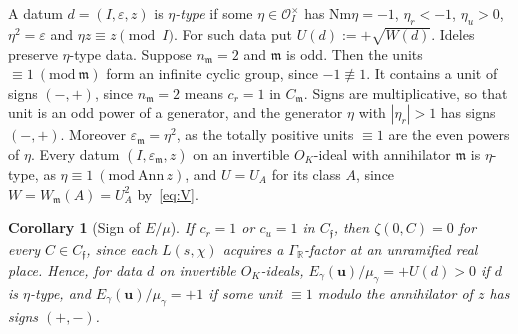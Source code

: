 \documentclass[11pt]{amsart}
\numberwithin{equation}{section}
\theoremstyle{plain}
\newtheorem{corollary}[theorem]{Corollary}
\theoremstyle{definition}
\theoremstyle{remark}
\newcommand{\Nm}{\mathrm{Nm}}
\begin{document}
A datum \(d=(I,\varepsilon,z)\) is \emph{\(\eta\)-type} if some \(\eta\in\mathcal O_I^\times\) has \(\Nm\eta=-1\), \(\eta_r<-1\), \(\eta_u>0\), \(\eta^2=\varepsilon\) and \(\eta z\equiv z\pmod I\). For such data put \(U(d):=+\sqrt{W(d)}\). Ideles preserve \(\eta\)-type data. Suppose \(n_{\mathfrak m}=2\) and \(\mathfrak m\) is odd. Then the units \(\equiv1\ (\mathrm{mod}\ \mathfrak m)\) form an infinite cyclic group, since \(-1\not\equiv1\). It contains a unit of signs \((-,+)\), since \(n_{\mathfrak m}=2\) means \(c_r=1\) in \(C_{\mathfrak m}\). Signs are multiplicative, so that unit is an odd power of a generator, and the generator \(\eta\) with \(|\eta_r|>1\) has signs \((-,+)\). Moreover \(\varepsilon_{\mathfrak m}=\eta^2\), as the totally positive units \(\equiv1\) are the even powers of \(\eta\). Every datum \((I,\varepsilon_{\mathfrak m},z)\) on an invertible \(O_K\)-ideal with annihilator \(\mathfrak m\) is \(\eta\)-type, as \(\eta\equiv1\ (\mathrm{mod}\ \mathrm{Ann}\,z)\), and \(U=U_A\) for its class \(A\), since \(W=W_{\mathfrak m}(A)=U_A^2\) by~\eqref{eq:V}.

\begin{corollary}[Sign of \(E/\mu\)]\label{cor:signEmu}
If \(c_r=1\) or \(c_u=1\) in \(C_{\mathfrak f}\), then \(\zeta(0,C)=0\) for every \(C\in C_{\mathfrak f}\), since each \(L(s,\chi)\) acquires a \(\Gamma_{\mathbb R}\)-factor at an unramified real place. Hence, for data \(d\) on invertible \(O_K\)-ideals, \(E_\gamma(\mathbf u)/\mu_\gamma=+U(d)>0\) if \(d\) is \(\eta\)-type, and \(E_\gamma(\mathbf u)/\mu_\gamma=+1\) if some unit \(\equiv1\) modulo the annihilator of \(z\) has signs \((+,-)\).
\end{corollary}
\end{document}

